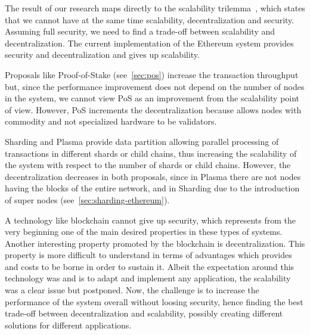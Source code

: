The result of our research maps directly to the scalability
trilemma~\cite{bib:sharding-faq}, which states that we cannot have at the same
time scalability, decentralization and security. Assuming full security, we need
to find a trade-off between scalability and decentralization. The current
implementation of the Ethereum system provides security and decentralization and
gives up scalability.

Proposals like Proof-of-Stake (see~\autoref{sec:pos}) increase the transaction
throughput but, since the performance improvement does not depend on the number
of nodes in the system, we cannot view PoS as an improvement from the
scalability point of view. However, PoS increments the decentralization because
allows nodes with commodity and not specialized hardware to be validators.

Sharding and Plasma provide data partition allowing parallel processing of
transactions in different shards or child chains, thus increasing the
scalability of the system with respect to the number of shards or child chains.
However, the decentralization decreases in both proposals, since in Plasma there
are not nodes having the blocks of the entire network, and in Sharding due to
the introduction of super nodes (see~\autoref{sec:sharding-ethereum}).

A technology like blockchain cannot give up security, which represents from
the very beginning one of the main desired properties in these types of
systems. Another interesting property promoted by the blockchain is
decentralization. This property is more difficult to understand in terms of
advantages which provides and costs to be borne in order to sustain it. Albeit
the expectation around this technology was and is to adapt and implement any
application, the scalability was a clear issue but postponed. Now, the challenge
is to increase the performance of the system overall without loosing security,
hence finding the best trade-off between decentralization and scalability,
possibly creating different solutions for different applications.
